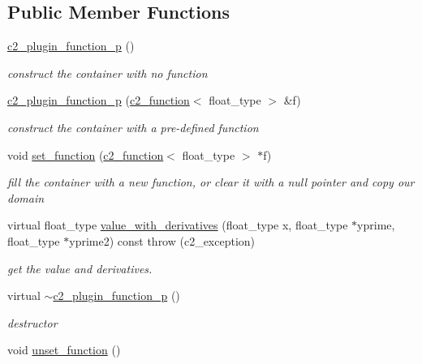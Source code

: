 \subsection*{Public Member Functions}
\begin{DoxyCompactItemize}
\item 
\hyperlink{classc2__plugin__function__p_aead9e593b067ffcb7387b350db7ea920}{c2\+\_\+plugin\+\_\+function\+\_\+p} ()
\begin{DoxyCompactList}\small\item\em construct the container with no function \end{DoxyCompactList}\item 
\hyperlink{classc2__plugin__function__p_a6b2825f01dffa6eaf84f7d4355a97f03}{c2\+\_\+plugin\+\_\+function\+\_\+p} (\hyperlink{classc2__function}{c2\+\_\+function}$<$ float\+\_\+type $>$ \&f)
\begin{DoxyCompactList}\small\item\em construct the container with a pre-\/defined function \end{DoxyCompactList}\item 
void \hyperlink{classc2__plugin__function__p_a5d06682ac3e78308631700b1cde961ef}{set\+\_\+function} (\hyperlink{classc2__function}{c2\+\_\+function}$<$ float\+\_\+type $>$ $\ast$f)
\begin{DoxyCompactList}\small\item\em fill the container with a new function, or clear it with a null pointer and copy our domain \end{DoxyCompactList}\item 
virtual float\+\_\+type \hyperlink{classc2__plugin__function__p_a7a5f8926ecec5b73f32ad5f90cefe80e}{value\+\_\+with\+\_\+derivatives} (float\+\_\+type x, float\+\_\+type $\ast$yprime, float\+\_\+type $\ast$yprime2) const   throw (c2\+\_\+exception)
\begin{DoxyCompactList}\small\item\em get the value and derivatives. \end{DoxyCompactList}\item 
virtual \hyperlink{classc2__plugin__function__p_aac74d9e2221ee6b8fee5adc579960530}{$\sim$c2\+\_\+plugin\+\_\+function\+\_\+p} ()
\begin{DoxyCompactList}\small\item\em destructor \end{DoxyCompactList}\item 
void \hyperlink{classc2__plugin__function__p_aebe716e59908fe373f85e5aac964441f}{unset\+\_\+function} ()

\end{DoxyCompactItemize}
